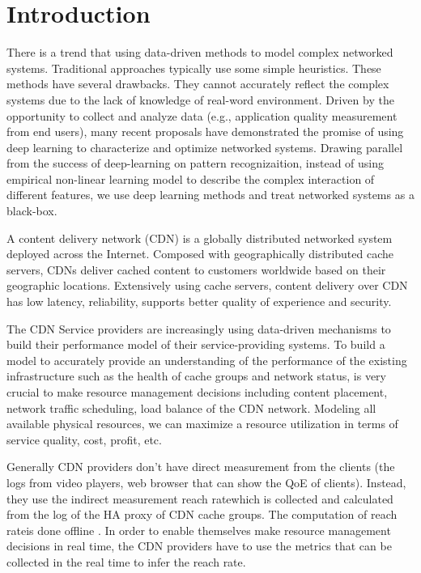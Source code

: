 \documentclass[5p]{elsarticle}
\newcommand{\dabiaolv}{reach rate}
\begin{document}
\section{Introduction}
There is a trend \cite{Jiang2017Pytheas:Exploration-Exploitation} \cite{Mao2017NeuralPensieve} \cite{Li2017} \cite{JiangVIA:Selection} \cite{GaoMachineOptimization} that using data-driven methods to model complex networked systems. Traditional approaches typically use some simple heuristics. These methods have several drawbacks. They cannot accurately reflect the complex systems due to the lack of knowledge of real-word environment. Driven by the opportunity to collect and analyze data (e.g., application quality measurement from end users), many recent proposals have demonstrated the promise of using deep learning to characterize and optimize networked systems. Drawing parallel from the success of deep-learning on pattern recognizaition, instead of using empirical non-linear learning model to describe the complex interaction of different features, we use deep learning methods and treat networked systems as a black-box.

A content delivery network (CDN) is a globally distributed networked system deployed across the Internet. Composed with geographically distributed cache servers, CDNs deliver cached content  to  customers  worldwide  based  on their geographic locations. Extensively  using  cache  servers,  content  delivery over  CDN  has  low  latency, reliability, supports better quality of experience and security.

The CDN Service providers are increasingly using data-driven mechanisms to build their performance model of their service-providing systems. To build a model to accurately provide an understanding of the performance of the existing infrastructure such as the health of cache groups and network status, is very crucial to make resource management decisions including content placement, network traffic scheduling, load balance of the CDN network. Modeling all available physical resources, we can maximize a resource utilization in terms of service quality, cost, profit, etc.

Generally CDN providers don't have direct measurement from the clients (the logs from video players, web browser that can show the QoE of clients). Instead, they use the indirect measurement \dabiaolv which is collected and calculated from the log of the HA proxy of CDN cache groups. The computation of \dabiaolv is done offline . In order to enable themselves make resource management decisions in real time, the CDN providers have to use the metrics that can be collected in the real time to infer the \dabiaolv. 
\end{document}
